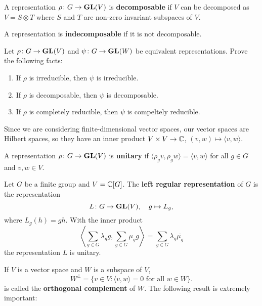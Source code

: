 \begin{definition}
A representation
$\rho\colon G\to\mathbf{GL}(V)$ is \textbf{decomposable} if $V$ can be decomposed as $V=S\otimes T$
where $S$ and $T$ are non-zero invariant subspaces of $V$. 
\end{definition}

A representation is 
\textbf{indecomposable} if it is not decomposable. 

\begin{exercise}
\label{xca:equivalence}
	Let $\rho\colon G\to\mathbf{GL}(V)$ and $\psi\colon G\to\mathbf{GL}(W)$ be equivalent representations.
	Prove the following facts:
	\begin{enumerate}
		\item If $\rho$ is irreducible, then $\psi$ is irreducible.
		\item If $\rho$ is decomposable, then $\psi$ is decomposable.
		\item If $\rho$ is completely reducible, then $\psi$ is compeltely reducible. 
	\end{enumerate}	
\end{exercise}

Since we are considering finite-dimensional vector spaces, our vector spaces are
Hilbert spaces, so they have
an inner product $V\times V\to\mathbb{C}$, $(v,w)\mapsto\langle v,w\rangle$.

\begin{definition}
    A representation $\rho\colon G\to\mathbf{GL}(V)$ is \textbf{unitary} if
    $\langle \rho_gv,\rho_gw\rangle=\langle v,w\rangle$ for all $g\in G$ and $v,w\in V$.
\end{definition}

\begin{example}
Let $G$ be a finite group and $V=\mathbb{C}[G]$. The \textbf{left regular representation}
of $G$ is the representation
\[
L\colon G\to\mathbf{GL}(V),
\quad
g\mapsto L_g,
\]
where $L_g(h)=gh$. With the inner product
\[
\left\langle\sum_{g\in G}\lambda_gg,\sum_{g\in G}\mu_gg\right\rangle=\sum_{g\in G}\lambda_g\overline{\mu_g}
\]
the representation $L$ is unitary.
\end{example}



If $V$ is a vector space and $W$ is a subspace of $V$, 
\[
W^\perp = \{v\in V:\langle v,w\rangle=0\text{ for all $w\in W$}\}.
\]
is called the 
\textbf{orthogonal complement} of $W$. The following result is extremely important: 

